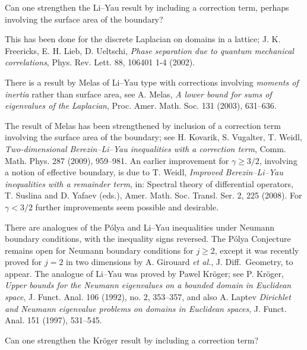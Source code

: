 \documentclass[12pt,letterpaper, reqno]{amsart}
\begin{document}
\begin{problemblock}


\begin{problem}
 Can one strengthen the Li--Yau result by
including a correction term, perhaps involving the surface area of
the boundary?
\end{problem}

This has been done for the discrete
Laplacian on domains in a lattice; J. K. Freericks, E. H. Lieb, D. Ueltschi, \emph{Phase separation due to quantum mechanical correlations}, Phys. Rev. Lett. 88, 106401 1-4 (2002).

\begin{remark}
There is a result by Melas of Li--Yau type with
corrections involving \emph{moments of inertia} rather than surface
area, see A. Melas, \emph{A lower bound for sums of eigenvalues of the Laplacian},
Proc. Amer. Math. Soc. 131 (2003), 631--636.
\end{remark}

\begin{remark}
 The result of Melas has been strengthened by inclusion
of a correction term involving the surface area of the boundary; see
H. Kovarik, S. Vugalter, T. Weidl, \emph{Two-dimensional Berezin--Li--Yau
inequalities with a correction term}, Comm. Math. Phys. 287 (2009),
959--981. An earlier improvement for $\gamma\geq 3/2$, involving
a notion of effective boundary, is due to T. Weidl, \emph{Improved
Berezin--Li--Yau inequalities with a remainder term}, in: Spectral
theory of differential operators, T. Suslina and D. Yafaev (eds.),
Amer. Math. Soc. Transl. Ser. 2, 225 (2008). For $\gamma<3/2$ further
improvements seem possible and desirable.
\end{remark}

\end{problemblock}


\begin{problemblock}


There are analogues of the P\'{o}lya and Li--Yau inequalities under
Neumann boundary conditions, with the inequality signs reversed. The P\'{o}lya Conjecture
remains open for Neumann boundary conditions for $j \geq 2$, except it was recently proved for $j=2$ in two dimensions by A. Girouard \emph{et al.}, J. Diff.\ Geometry, to appear. The analogue
of Li--Yau was proved by Pawel Kr\"{o}ger; see P. Kr\"{o}ger, \emph{Upper bounds for the Neumann eigenvalues on a bounded domain in Euclidean space}, J. Funct. Anal.  106  (1992),  no. 2, 353--357, and also A. Laptev \emph{Dirichlet and Neumann
eigenvalue problems on domains in Euclidean spaces}, J. Funct. Anal.
151 (1997), 531--545. 

\begin{problem}
Can one strengthen the Kr\"{o}ger result by including a correction term?

\end{problem}

\end{problemblock}
\end{document}
